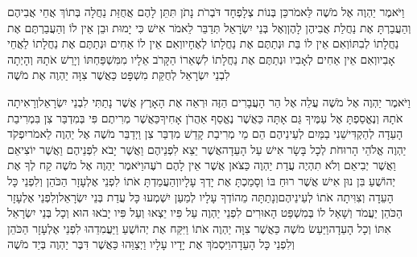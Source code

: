 \documentclass[../main/main.tex]{subfiles}
\begin{document}
\begin{multicols*}{\ncols}
וַיֹּאמֶר יַהְוֶה אֶל מֹשֶׁה לֵּאמֹר\PreVerseSpace{}כֵּן בְּנוֹת צְלָפְחָד דֹּבְרֹת נָתֹן תִּתֵּן לָהֶם אֲחֻזַּת נַחֲלָה בְּתוֹךְ אֲחֵי אֲבִיהֶם וְהַעֲבַרְתָּ אֶת נַחֲלַת אֲבִיהֶן לָהֶן\PreVerseSpace{}וְאֶל בְּנֵי יִשְׂרָאֵל תְּדַבֵּר לֵאמֹר אִישׁ כִּי יָמוּת וּבֵן אֵין לוֹ וְהַעֲבַרְתֶּם אֶת נַחֲלָתוֹ לְבִתּוֹ\PreVerseSpace{}וְאִם אֵין לוֹ בַּת וּנְתַתֶּם אֶת נַחֲלָתוֹ לְאֶחָיו\PreVerseSpace{}וְאִם אֵין לוֹ אַחִים וּנְתַתֶּם אֶת נַחֲלָתוֹ לַאֲחֵי אָבִיו\PreVerseSpace{}וְאִם אֵין אַחִים לְאָבִיו וּנְתַתֶּם אֶת נַחֲלָתוֹ לִשְׁאֵרוֹ הַקָּרֹב אֵלָיו מִמִּשְׁפַּחְתּוֹ וְיָרַשׁ אֹתָהּ וְהָיְתָה לִבְנֵי יִשְׂרָאֵל לְחֻקַּת מִשְׁפָּט כַּאֲשֶׁר צִוָּה יַהְוֶה אֶת מֹשֶׁה\OpenSection{}\par
{}וַיֹּאמֶר יַהְוֶה אֶל מֹשֶׁה עֲלֵה אֶל הַר הָעֲבָרִים הַזֶּה וּרְאֵה אֶת הָאָרֶץ אֲשֶׁר נָתַתִּי לִבְנֵי יִשְׂרָאֵל\PreVerseSpace{}וְרָאִיתָה אֹתָהּ וְנֶאֱסַפְתָּ אֶל עַמֶּיךָ גַּם אָתָּה כַּאֲשֶׁר נֶאֱסַף אַהֲרֹן אָחִיךָ\PreVerseSpace{}כַּאֲשֶׁר מְרִיתֶם פִּי בְּמִדְבַּר צִן בִּמְרִיבַת הָעֵדָה לְהַקְדִּישֵׁנִי בַמַּיִם לְעֵינֵיהֶם הֵם מֵי מְרִיבַת קָדֵשׁ מִדְבַּר צִן \ClosedSection{}וַיְדַבֵּר מֹשֶׁה אֶל יַהְוֶה לֵאמֹר\PreVerseSpace{}יִפְקֹד יַהְוֶה אֱלֹהֵי הָרוּחֹת לְכָל בָּשָׂר אִישׁ עַל הָעֵדָה\PreVerseSpace{}אֲשֶׁר יֵצֵא לִפְנֵיהֶם וַאֲשֶׁר יָבֹא לִפְנֵיהֶם וַאֲשֶׁר יוֹצִיאֵם וַאֲשֶׁר יְבִיאֵם וְלֹא תִהְיֶה עֲדַת יַהְוֶה כַּצֹּאן אֲשֶׁר אֵין לָהֶם רֹעֶה\PreVerseSpace{}וַיֹּאמֶר יַהְוֶה אֶל מֹשֶׁה קַח לְךָ אֶת יְהוֹשֻׁעַ בִּן נוּן אִישׁ אֲשֶׁר רוּחַ בּוֹ וְסָמַכְתָּ אֶת יָדְךָ עָלָיו\PreVerseSpace{}וְהַעֲמַדְתָּ אֹתוֹ לִפְנֵי אֶלְעָזָר הַכֹּהֵן וְלִפְנֵי כָּל הָעֵדָה וְצִוִּיתָה אֹתוֹ לְעֵינֵיהֶם\PreVerseSpace{}וְנָתַתָּה מֵהוֹדְךָ עָלָיו לְמַעַן יִשְׁמְעוּ כָּל עֲדַת בְּנֵי יִשְׂרָאֵל\PreVerseSpace{}וְלִפְנֵי אֶלְעָזָר הַכֹּהֵן יַעֲמֹד וְשָׁאַל לוֹ בְּמִשְׁפַּט הָאוּרִים לִפְנֵי יַהְוֶה עַל פִּיו יֵצְאוּ וְעַל פִּיו יָבֹאוּ הוּא וְכָל בְּנֵי יִשְׂרָאֵל אִתּוֹ וְכָל הָעֵדָה\PreVerseSpace{}וַיַּעַשׂ מֹשֶׁה כַּאֲשֶׁר צִוָּה יַהְוֶה אֹתוֹ וַיִּקַּח אֶת יְהוֹשֻׁעַ וַיַּעֲמִדֵהוּ לִפְנֵי אֶלְעָזָר הַכֹּהֵן וְלִפְנֵי כָּל הָעֵדָה\PreVerseSpace{}וַיִּסְמֹךְ אֶת יָדָיו עָלָיו וַיְצַוֵּהוּ כַּאֲשֶׁר דִּבֶּר יַהְוֶה בְּיַד מֹשֶׁה\OpenSection{}\par

\end{multicols*}
\end{document}
